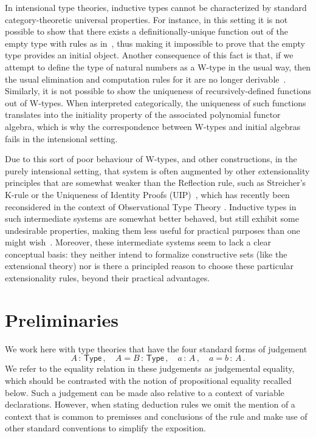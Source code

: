 \documentclass[10pt,a4paper,oneside,reqno]{amsart}
\theoremstyle{mythm}
\theoremstyle{mydef}
\theoremstyle{myrmk}
\newcommand{\deq}{=}
\newcommand{\co}{\,{:}\,}
\newcommand{\type}{\mathsf{Type}}
\begin{document}
In intensional type theories, inductive types cannot be characterized by standard category-theoretic
universal properties. For instance, in this setting it is not possible to show that there exists a 
definitionally-unique function out of the empty type with rules as in~\cite[Section~5.2]{NordstromB:marltt}, thus making it impossible to prove that the empty type provides an initial object. 
Another consequence of this fact is that, if we attempt to define the type of 
natural numbers as a W-type in the usual way, then 
the usual elimination and computation rules for it are no longer derivable~\cite{DybjerP:repids}. Similarly, it is not possible to show the uniqueness of recursively-defined functions out of W-types. When interpreted categorically, the uniqueness of such functions translates into the initiality property of the associated polynomial functor algebra, which is why the correspondence between W-types and initial algebras fails in the intensional setting.

Due to this sort of poor behaviour of W-types, and other constructions, in the purely intensional setting, that system is often augmented by other extensionality principles that are somewhat weaker than the Reflection rule, such as Streicher's K-rule  or the Uniqueness of Identity Proofs (UIP)~\cite{StreicherT:invitt}, which has recently been reconsidered
in the context of Observational Type Theory \cite{AltenkirchT:obsen}.  Inductive types in such intermediate systems are somewhat better behaved, but still exhibit some undesirable properties, making them less useful for practical purposes than one might wish~\cite{McBrideC:wtygnb}.  Moreover, these intermediate systems seem to lack a clear conceptual basis:  they neither intend to formalize constructive sets (like the extensional theory) nor is there a principled reason to choose these particular extensionality rules, beyond their practical advantages.  


\newpage

\section{Preliminaries}
\label{section:prelim}



We work here with type theories that have the four standard forms of judgement
\[
A \co \type \, , \quad A \deq B \co \type \, , \quad   a \co A \, , \quad a \deq b \co A \, . 
\]
We refer to the equality relation in these judgements as judgemental equality, 
which should be contrasted with the notion of propositional equality
recalled below. 
Such a judgement  can be made also relative to a context of variable declarations.
However, when stating deduction
rules we  omit the mention
of a context that is common to premisses and conclusions of the rule and
make use of other standard conventions to simplify the exposition.
\end{document}
